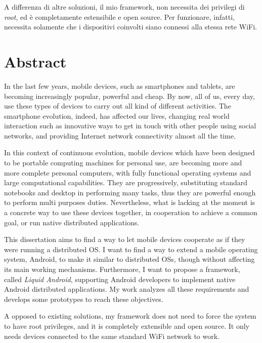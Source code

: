 \par A differenza di altre soluzioni, il mio framework, non necessita dei privilegi di \textit{root}, ed è completamente estensibile e open source. Per funzionare, infatti, necessita solamente che i dispositivi coinvolti siano connessi alla stessa rete WiFi.
%
\cleardoublepage
%
%
%
%
\chapter*{Abstract}
\par In the last few years, mobile devices, such as smartphones and tablets, are becoming increasingly popular, powerful and cheap.
By now, all of us, every day, use these types of devices to carry out all kind of different activities. The smartphone evolution, indeed, has affected our lives, changing real world interaction such as innovative ways to get in touch with other people using social networks, and providing Internet network connectivity almost all the time.\\
\par In this context of continuous evolution, mobile devices which have been designed to be portable computing machines for personal use, are becoming more and more complete personal computers, with fully functional operating systems and large computational capabilities. They are progressively, substituting standard notebooks and desktop in performing many tasks, thus they are powerful enough to perform multi purposes duties. Nevertheless, what is lacking at the moment is a concrete way to use these devices together, in cooperation to achieve a common goal, or run native distributed applications.\\
\par This dissertation aims to find a way to let mobile devices cooperate as if they were running a distributed OS. I want to find a way to extend a mobile operating system, Android, to make it similar to distributed OSs, though without affecting its main working mechanisms. Furthermore, I want to propose a framework, called \textit{Liquid Android}, supporting Android developers to implement native Android distributed applications.  My work analyzes all these requirements and develops some prototypes to reach these objectives.\\
\par A opposed to existing solutions, my framework does not need to force the system to have root privileges, and it is completely extensible and open source. It only needs devices connected to the same standard WiFi network to work.


\medskip
%
